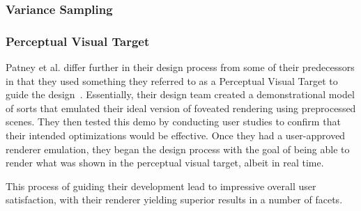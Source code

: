 \documentclass{sig-alternate}
\begin{document}
\subsubsection{Variance Sampling}
\label{variance}


\subsubsection{Perceptual Visual Target}
\label{visualTarget}
Patney et al. differ further in their design process from some of their predecessors in that they used something they referred to as a Perceptual Visual Target to guide the design~\cite{Patney:Towards}. Essentially, their design team created a demonstrational model of sorts that emulated their ideal version of foveated rendering using preprocessed scenes. They then tested this demo by conducting user studies to confirm that their intended optimizations would be effective. Once they had a user-approved renderer emulation, they began the design process with the goal of being able to render what was shown in the perceptual visual target, albeit in real time. 

This process of guiding their development lead to impressive overall user satisfaction, with their renderer yielding superior results in a number of facets.


\iffalse
\begin{figure}
\centering
\psfig{file=frMethods_Patney.png,width =3in}
\caption{Comparison of different foveation techniques by Patney et al. in their studies on what threshold of blur rate their users couldn't detect.~\cite{Patney:Towards}}
\label{fig:fig3}
\end{figure}


\begin{figure}
\centering
\psfig{file=sampling_eccentricity_Patney.png,width =3in}
\caption{Comparison of sampling approaches by patney et al. and Guenter et al.~\cite{Patney:Towards}}
\label{fig:fig2}
\end{figure}


\begin{figure}
\centering
\psfig{file=transition_region_Patney.png,width =3in}
\caption{Comparison Transition Region Size for Guenter et al. and Patney et al. In this instance, having a lower threshold is ideal because that allows more peripheral pixels to be shaded, reducing computational overhead.~\cite{Patney:Towards}}
\label{fig:fig4}
\end{figure}
\fi
\end{document}
